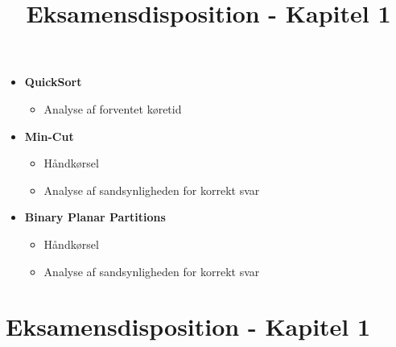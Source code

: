 
\title{Eksamensdisposition - Kapitel 1}


\maketitle


\begin{itemize}
  \item \textbf{QuickSort}
  \begin{itemize}
    \item Analyse af forventet køretid
  \end{itemize}

  \item \textbf{Min-Cut}
  \begin{itemize}
    \item Håndkørsel
    \item Analyse af sandsynligheden for korrekt svar
  \end{itemize}

  \item \textbf{Binary Planar Partitions}
  \begin{itemize}
    \item Håndkørsel
    \item Analyse af sandsynligheden for korrekt svar
  \end{itemize}
\end{itemize}

\newpage
\section{Eksamensdisposition - Kapitel 1}





